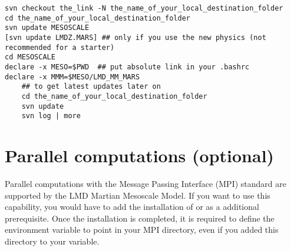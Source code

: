 \begin{verbatim}
svn checkout the_link -N the_name_of_your_local_destination_folder
cd the_name_of_your_local_destination_folder
svn update MESOSCALE
[svn update LMDZ.MARS] ## only if you use the new physics (not recommended for a starter)
cd MESOSCALE
declare -x MESO=$PWD  ## put absolute link in your .bashrc
declare -x MMM=$MESO/LMD_MM_MARS
    ## to get latest updates later on
    cd the_name_of_your_local_destination_folder
    svn update
    svn log | more
\end{verbatim}

\mk
\section{Parallel computations (optional)}

\sk
Parallel computations with the Message Passing Interface (MPI) standard are supported by the LMD Martian Mesoscale Model. If you want to use this capability, you would have to add the installation of  or  as a additional prerequisite. Once the installation is completed, it is required to define the environment variable  to point in your MPI  directory, even if you added this directory to your  variable. 


\clearemptydoublepage
